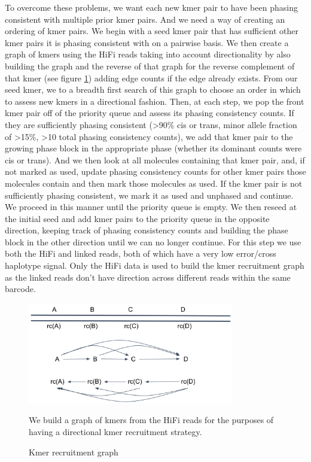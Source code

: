 {\par{
To overcome these problems, we want each new kmer pair to have been phasing consistent with multiple prior kmer pairs. And we need a way of creating an ordering of kmer pairs. We begin with a seed kmer pair that has sufficient other kmer pairs it is phasing consistent with on a pairwise basis. We then create a graph of kmers using the HiFi reads taking into account directionality by also building the graph and the reverse of that graph for the reverse complement of that kmer (see figure \ref{figure:assemblygraph}) adding edge counts if the edge already exists. From our seed kmer, we to a breadth first search of this graph to choose an order in which to assess new kmers in a directional fashion. Then, at each step, we pop the front kmer pair off of the priority queue and assess its phasing consistency counts. If they are sufficiently phasing consistent (>90\% cis or trans, minor allele fraction of >15\%, >10 total phasing consistency counts), we add that kmer pair to the growing phase block in the appropriate phase (whether its dominant counts were cis or trans). And we then look at all molecules containing that kmer pair, and, if not marked as used, update phasing consistency counts for other kmer pairs those molecules contain and then mark those molecules as used. If the kmer pair is not sufficiently phasing consistent, we mark it as used and unphased and continue. We proceed in this manner until the priority queue is empty. We then reseed at the initial seed and add kmer pairs to the priority queue in the opposite direction, keeping track of phasing consistency counts and building the phase block in the other direction until we can no longer continue. For this step we use both the HiFi and linked reads, both of which have a very low error/cross haplotype signal. Only the HiFi data is used to build the kmer recruitment graph as the linked reads don't have direction across different reads within the same barcode.
}

\begin{figure}[htbp!]
\caption{Kmer recruitment graph}
\label{figure:assemblygraph}
\begin{centering}
\includegraphics[width=0.8\textwidth]{assemblygraph.png}
\par{We build a graph of kmers from the HiFi reads for the purposes of having a directional kmer recruitment strategy. }
\end{centering}
\end{figure}

}

